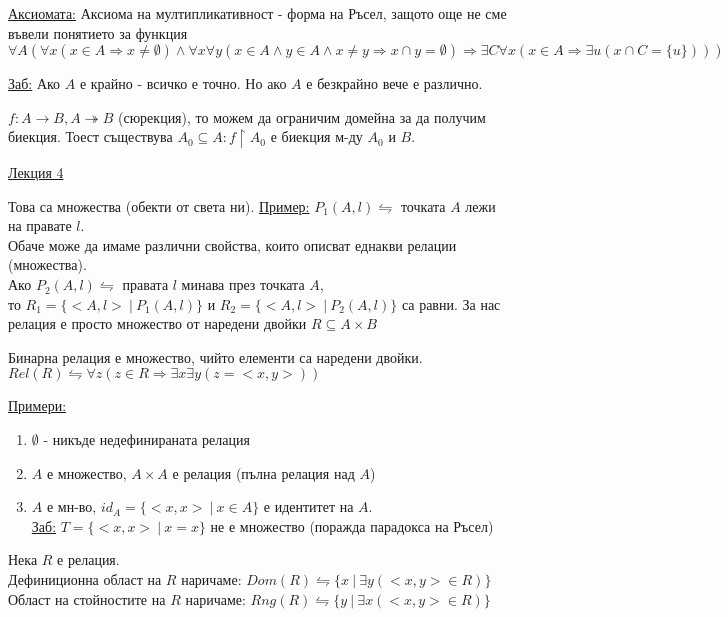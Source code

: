 \documentclass[fleqn, titlepage, 12pt]{report}
\begin{document}
\underline{Аксиомата:} Аксиома на мултипликативност - форма на Ръсел, защото още не сме въвели понятието за функция\\
$ \forall{A} ( \forall{x} (x \in A \Rightarrow x \neq \emptyset) \land \forall{x} \forall{y} (x \in A \land y \in A \land x \neq y \Rightarrow x \cap y = \emptyset) \Rightarrow \exists{C} \forall{x} (x \in A \Rightarrow  \exists{u} (x \cap C = \{ u\})))$
\bigbreak

\underline{Заб:} Ако $A$ е крайно - всичко е точно. Но ако $A$ е безкрайно вече е различно.
\bigbreak

$ f: A \rightarrow B, A \twoheadrightarrow B$ (сюрекция), то можем да ограничим домейна за да получим биекция.
Тоест съществува $A_0 \subseteq A : f \upharpoonright A_0$ е биекция м-ду $A_0$ и $B$.

\clearpage
\begin{center}
  \underline{\huge\normalfont Лекция 4}
\end{center}
\bigbreak

 Това са множества (обекти от света ни).
\bigbreak
\underline{Пример:} $P_1(A,l) \leftrightharpoons$ точката $ A $ лежи на правате $l$.\\
Обаче може да имаме различни свойства, които описват еднакви релации (множества).\\
Ако $P_2(A,l) \leftrightharpoons$ правата $l$ минава през точката $A$,\\
то $R_1 = \{<A,l>\ |\ P_1(A,l)\}$ и $R_2 = \{<A,l>\ |\ P_2(A,l)\}$ са равни.
За нас релация е просто множество от наредени двойки $R \subseteq A \times B$
\bigbreak

 Бинарна релация е множество, чийто елементи са наредени двойки.\\
$Rel(R) \leftrightharpoons \forall{z}(z \in R \Rightarrow \exists{x} \exists{y}(z = <x,y>))$
\bigbreak

\underline{Примери:}
\begin{enumerate}
  \item $ \emptyset$ - никъде недефинираната релация
  \item $A$ е множество, $A \times A$ е релация (пълна релация над $A$)
  \item $A$ е мн-во, $id_A = \{<x,x>\ |\ x \in A\}$ е идентитет на $A$.\\
    \underline{Заб:} $T = \{<x,x>\ |\ x = x\}$ не е множество (поражда парадокса на Ръсел)
\end{enumerate}
\bigbreak

 Нека $R$ е релация.\\
Дефиниционна област на $R$ наричаме: $Dom(R) \leftrightharpoons \{x\ |\ \exists{y}(<x,y> \in R)\}$\\
Област на стойностите на $R$ наричаме: $Rng(R) \leftrightharpoons \{y\ |\ \exists{x}(<x,y> \in R)\}$
\bigbreak
\end{document}
